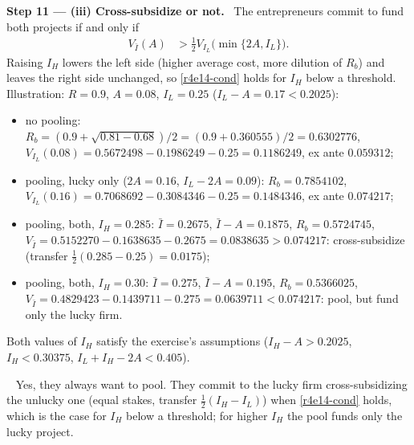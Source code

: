 \documentclass[11pt,a4paper]{article}
\newcommand{\step}[2]{\par\medskip\noindent\textbf{Step #1 --- #2.}~}
\newcommand{\answer}[1]{\par\smallskip\noindent\fbox{\textbf{Answer #1.}}~}
\begin{document}
\step{11}{(iii) Cross-subsidize or not} The entrepreneurs commit to fund both projects if and
only if
\begin{align}
  V_{\bar I}(A) &> \tfrac12V_{I_L}\big(\min\{2A,I_L\}\big). \label{r4e14-cond}
\end{align}
Raising $I_H$ lowers the left side (higher average cost, more dilution of $R_b$) and leaves the
right side unchanged, so \eqref{r4e14-cond} holds for $I_H$ below a threshold. Illustration:
$R=0.9$, $A=0.08$, $I_L=0.25$ ($I_L-A=0.17<0.2025$):
\begin{itemize}
  \item no pooling: $R_b=(0.9+\sqrt{0.81-0.68})/2=(0.9+0.360555)/2=0.6302776$,
        $V_{I_L}(0.08)=0.5672498-0.1986249-0.25=0.1186249$, ex ante $0.059312$;
  \item pooling, lucky only ($2A=0.16$, $I_L-2A=0.09$): $R_b=0.7854102$,
        $V_{I_L}(0.16)=0.7068692-0.3084346-0.25=0.1484346$, ex ante $0.074217$;
  \item pooling, both, $I_H=0.285$: $\bar I=0.2675$, $\bar I-A=0.1875$, $R_b=0.5724745$,
        $V_{\bar I}=0.5152270-0.1638635-0.2675=0.0838635>0.074217$: cross-subsidize
        (transfer $\tfrac12(0.285-0.25)=0.0175$);
  \item pooling, both, $I_H=0.30$: $\bar I=0.275$, $\bar I-A=0.195$, $R_b=0.5366025$,
        $V_{\bar I}=0.4829423-0.1439711-0.275=0.0639711<0.074217$: pool, but fund only the lucky firm.
\end{itemize}
Both values of $I_H$ satisfy the exercise's assumptions ($I_H-A>0.2025$, $I_H<0.30375$,
$I_L+I_H-2A<0.405$).

\answer{(iii)} Yes, they always want to pool. They commit to the lucky firm cross-subsidizing the
unlucky one (equal stakes, transfer $\tfrac12(I_H-I_L)$) when \eqref{r4e14-cond} holds, which is
the case for $I_H$ below a threshold; for higher $I_H$ the pool funds only the lucky project.
\end{document}

